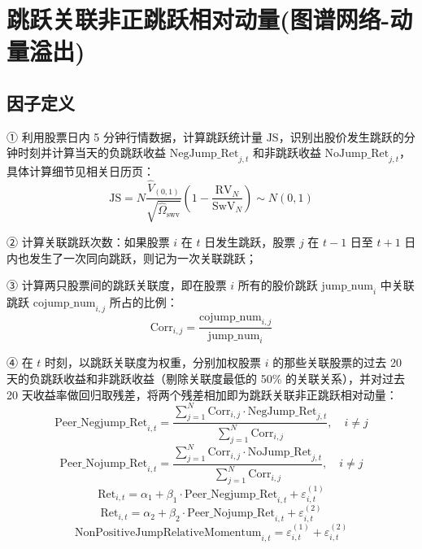 \documentclass{article}
\begin{document}
\section{跳跃关联非正跳跃相对动量(图谱网络-动量溢出)}

\subsection{因子定义}

① 利用股票日内 5 分钟行情数据，计算跳跃统计量 \( \mathrm{JS} \)，识别出股价发生跳跃的分钟时刻并计算当天的负跳跃收益 \( \mathrm{NegJump\_Ret}_{j,t} \) 和非跳跃收益 \( \mathrm{NoJump\_Ret}_{j,t} \)，具体计算细节见相关日历页：
\begin{equation}
    \mathrm{JS} = N \frac{\hat{V}_{(0,1)}}{\sqrt{\hat{\Omega}_{\mathrm{swv}}}} \left( 1 - \frac{\mathrm{RV}_N}{\mathrm{SwV}_N} \right) \sim N(0,1)
\end{equation}

② 计算关联跳跃次数：如果股票 \( i \) 在 \( t \) 日发生跳跃，股票 \( j \) 在 \( t-1 \) 日至 \( t+1 \) 日内也发生了一次同向跳跃，则记为一次关联跳跃；

③ 计算两只股票间的跳跃关联度，即在股票 \( i \) 所有的股价跳跃 \( \mathrm{jump\_num}_i \) 中关联跳跃 \( \mathrm{cojump\_num}_{i,j} \) 所占的比例：
\begin{equation}
    \mathrm{Corr}_{i,j} = \frac{\mathrm{cojump\_num}_{i,j}}{\mathrm{jump\_num}_i}
\end{equation}

④ 在 \( t \) 时刻，以跳跃关联度为权重，分别加权股票 \( i \) 的那些关联股票的过去 20 天的负跳跃收益和非跳跃收益（剔除关联度最低的 50\% 的关联关系），并对过去 20 天收益率做回归取残差，将两个残差相加即为跳跃关联非正跳跃相对动量：
\begin{equation}
    \mathrm{Peer\_Negjump\_Ret}_{i,t} = \frac{\sum_{j=1}^{N} \mathrm{Corr}_{i,j} \cdot \mathrm{NegJump\_Ret}_{j,t}}{\sum_{j=1}^{N} \mathrm{Corr}_{i,j}}, \quad i \neq j
\end{equation}
\begin{equation}
    \mathrm{Peer\_Nojump\_Ret}_{i,t} = \frac{\sum_{j=1}^{N} \mathrm{Corr}_{i,j} \cdot \mathrm{NoJump\_Ret}_{j,t}}{\sum_{j=1}^{N} \mathrm{Corr}_{i,j}}, \quad i \neq j
\end{equation}
\begin{equation}
    \mathrm{Ret}_{i,t} = \alpha_1 + \beta_1 \cdot \mathrm{Peer\_Negjump\_Ret}_{i,t} + \varepsilon_{i,t}^{(1)}
\end{equation}
\begin{equation}
    \mathrm{Ret}_{i,t} = \alpha_2 + \beta_2 \cdot \mathrm{Peer\_Nojump\_Ret}_{i,t} + \varepsilon_{i,t}^{(2)}
\end{equation}
\begin{equation}
    \mathrm{NonPositiveJumpRelativeMomentum}_{i,t} = \varepsilon_{i,t}^{(1)} + \varepsilon_{i,t}^{(2)}
\end{equation}
\end{document}
